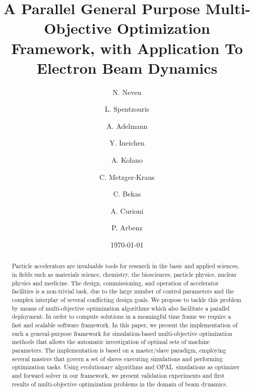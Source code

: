 \documentclass[%
reprint,
amsmath,amssymb,
aps,
prstab,
]{revtex4-1}
\begin{document}
\title{A Parallel General Purpose Multi-Objective Optimization Framework,
  with Application To Electron Beam Dynamics}



\author{N. Neveu}

\author{L. Spentzouris}

\author{A. Adelmann}
\author{Y. Ineichen }
\author{A. Kolano}
\author{C. Metzger-Kraus}
%

\author{C. Bekas}
\author{A. Curioni}

%

\author{P. Arbenz}
%

\date{\today}%


\begin{abstract}
Particle accelerators are invaluable tools for research in the basic and
  applied sciences, in fields such as materials science, chemistry,
  the biosciences, particle physics, nuclear physics and medicine.
The design, commissioning, and operation of accelerator facilities is a
  non-trivial task, due to the large number of control parameters and the
  complex interplay of several conflicting design goals.
We propose to tackle this problem by means of multi-objective optimization
  algorithms which also facilitate a parallel deployment.
In order to compute solutions in a meaningful time frame we require a fast
  and scalable software framework.
In this paper, we present the implementation of such a general-purpose
  framework for simulation-based multi-objective optimization methods that
  allows the automatic investigation of optimal sets of machine parameters.
The implementation is based on a master/slave paradigm, employing several
  masters that govern a set of slaves executing simulations and performing
  optimization tasks.
Using evolutionary algorithms and \textsc{OPAL}~simulations as optimizer and
  forward solver in our framework, we present validation experiments and first
  results of multi-objective optimization problems in the domain of beam
  dynamics.
  
\end{abstract}
\end{document}
